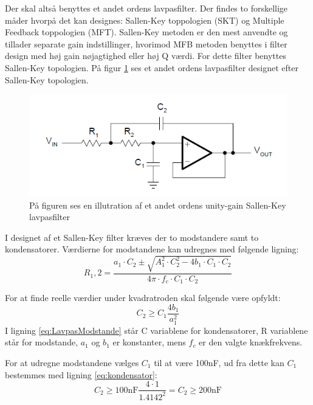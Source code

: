 Der skal altså benyttes et andet ordens lavpasfilter. Der findes to forskellige måder hvorpå det kan designes: Sallen-Key toppologien (SKT) og Multiple Feedback toppologien (MFT). Sallen-Key metoden er den mest anvendte og tillader separate gain indstillinger, hvorimod MFB metoden benyttes i filter design med høj gain nøjagtighed eller høj Q værdi. For dette filter benyttes Sallen-Key topologien. På figur \ref{fig:SallenKey} ses et andet ordens lavpasfilter designet efter Sallen-Key topologien. \cite{Carter2013}
\begin{figure}[H]
	\centering
	\includegraphics[scale=0.8]{figures/cProblemloesning/SallenLavpas.PNG}
	\caption{På figuren ses en illutration af et andet ordens unity-gain Sallen-Key lavpasfilter}
	\label{fig:SallenKey}
\end{figure}

I designet af et Sallen-Key filter kræves der to modstandere samt to kondensatorer. Værdierne for modstandene kan udregnes med følgende ligning:
\begin{equation} \label{eq:LavpasModstande}
R_1,2 = \frac{a_1 \cdot C_2 \pm \sqrt{A_1^2 \cdot C_2^2 - 4b_1 \cdot C_1 \cdot C_2}}{4 \pi \cdot f_c \cdot C_1 \cdot C_2}
\end{equation}

\noindent For at finde reelle værdier under kvadratroden skal følgende være opfyldt:
\begin{equation} \label{eq:kondensator}
C_2 \geq C_1 \frac{4b_1}{a_1^2}
\end{equation}
I ligning \ref{eq:LavpasModstande} står C variablene for kondensatorer, R variablene står for modstande, $a_1$ og $b_1$ er konstanter, mens $f_c$ er den valgte knækfrekvens. 

\noindent For at udregne modstandene vælges $C_1$ til at være 100nF, ud fra dette kan $C_1$ bestemmes med ligning \ref{eq:kondensator}:
\begin{equation}
C_2 \geq 100\text{nF} \frac{4\cdot 1}{1.4142^2} = C_2 \geq 200\text{nF}
\end{equation}

